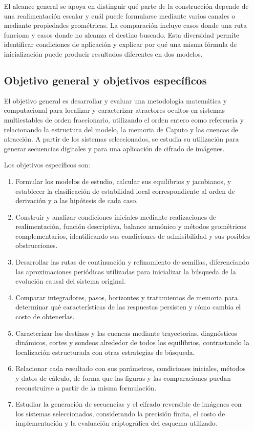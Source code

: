 El alcance general se apoya en distinguir qué parte de la construcción
depende de una realimentación escalar y cuál puede formularse mediante
varios canales o mediante propiedades geométricas. La comparación incluye
casos donde una ruta funciona y casos donde no alcanza el destino
buscado. Esta diversidad permite identificar condiciones de aplicación y
explicar por qué una misma fórmula de inicialización puede producir
resultados diferentes en dos modelos.

\subsection{Objetivo general y objetivos específicos}
\label{sec:cap1-objetivos}

El objetivo general es desarrollar y evaluar una metodología matemática
y computacional para localizar y caracterizar atractores ocultos en
sistemas multiestables de orden fraccionario, utilizando el orden entero
como referencia y relacionando la estructura del modelo, la memoria de
Caputo y las cuencas de atracción. A partir de los sistemas seleccionados,
se estudia su utilización para generar secuencias digitales y para una
aplicación de cifrado de imágenes.

Los objetivos específicos son:
\begin{enumerate}
\item Formular los modelos de estudio, calcular sus equilibrios y
      jacobianos, y establecer la clasificación de estabilidad local
      correspondiente al orden de derivación y a las hipótesis de cada caso.
\item Construir y analizar condiciones iniciales mediante realizaciones
      de realimentación, función descriptiva, balance armónico y métodos
      geométricos complementarios, identificando sus condiciones de
      admisibilidad y sus posibles obstrucciones.
\item Desarrollar las rutas de continuación y refinamiento de semillas,
      diferenciando las aproximaciones periódicas utilizadas para
      inicializar la búsqueda de la evolución causal del sistema original.
\item Comparar integradores, pasos, horizontes y tratamientos de memoria
      para determinar qué características de las respuestas persisten y
      cómo cambia el costo de obtenerlas.
\item Caracterizar los destinos y las cuencas mediante trayectorias,
      diagnósticos dinámicos, cortes y sondeos alrededor de todos los
      equilibrios, contrastando la localización estructurada con otras
      estrategias de búsqueda.
\item Relacionar cada resultado con sus parámetros, condiciones iniciales,
      métodos y datos de cálculo, de forma que las figuras y las
      comparaciones puedan reconstruirse a partir de la misma formulación.
\item Estudiar la generación de secuencias y el cifrado reversible de
      imágenes con los sistemas seleccionados, considerando la precisión
      finita, el costo de implementación y la evaluación criptográfica
      del esquema utilizado.
\end{enumerate}

